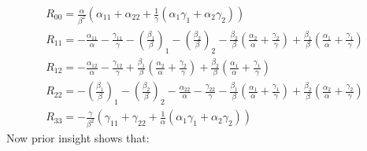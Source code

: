 \documentclass{article}
\begin{document}
\begin{equation}
\begin{array}{l}
R_{00}=\frac{\alpha}{\beta^{2}}\left(\alpha_{11}+\alpha_{22}+\frac{1}{\gamma}\left(\alpha_{1}\gamma_{1}+\alpha_{2}\gamma_{2}\right)\right)\\
R_{11}=-\frac{\alpha_{11}}{\alpha}-\frac{\gamma_{11}}{\gamma}-\left(\frac{\beta_{1}}{\beta}\right)_{1}-\left(\frac{\beta_{2}}{\beta}\right)_{2}-\frac{\beta_{2}}{\beta}\left(\frac{\alpha_{2}}{\alpha}+\frac{\gamma_{2}}{\gamma}\right)+\frac{\beta_{1}}{\beta}\left(\frac{\alpha_{1}}{\alpha}+\frac{\gamma_{1}}{\gamma}\right)\\
R_{12}=-\frac{\alpha_{12}}{\alpha}-\frac{\gamma_{12}}{\gamma}+\frac{\beta_{1}}{\beta}\left(\frac{\alpha_{2}}{\alpha}+\frac{\gamma_{2}}{\gamma}\right)+\frac{\beta_{2}}{\beta}\left(\frac{\alpha_{1}}{\alpha}+\frac{\gamma_{1}}{\gamma}\right)\\
R_{22}=-\left(\frac{\beta_{1}}{\beta}\right)_{1}-\left(\frac{\beta_{2}}{\beta}\right)_{2}-\frac{\alpha_{22}}{\alpha}-\frac{\gamma_{22}}{\gamma}-\frac{\beta_{1}}{\beta}\left(\frac{\alpha_{1}}{\alpha}+\frac{\gamma_{1}}{\gamma}\right)+\frac{\beta_{2}}{\beta}\left(\frac{\alpha_{2}}{\alpha}+\frac{\gamma_{2}}{\gamma}\right)\\
R_{33}=-\frac{\gamma}{\beta^{2}}\left(\gamma_{11}+\gamma_{22}+\frac{1}{\alpha}\left(\alpha_{1}\gamma_{1}+\alpha_{2}\gamma_{2}\right)\right)
\end{array}\label{eq:ricci-tensor-components}
\end{equation}
Now prior insight shows that:
\end{document}
